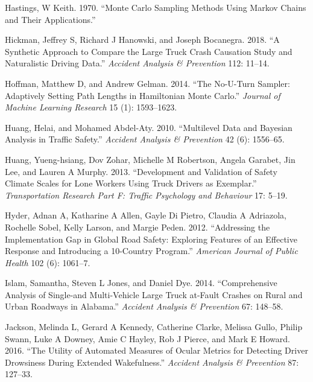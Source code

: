 \documentclass[12pt]{book}
\numberwithin{equation}{chapter}
\begin{document}
\leavevmode\hypertarget{ref-hastings1970monte}{}%
Hastings, W Keith. 1970. ``Monte Carlo Sampling Methods Using Markov Chains and Their Applications.''

\leavevmode\hypertarget{ref-hickman2018synthetic}{}%
Hickman, Jeffrey S, Richard J Hanowski, and Joseph Bocanegra. 2018. ``A Synthetic Approach to Compare the Large Truck Crash Causation Study and Naturalistic Driving Data.'' \emph{Accident Analysis \& Prevention} 112: 11--14.

\leavevmode\hypertarget{ref-hoffman2014no}{}%
Hoffman, Matthew D, and Andrew Gelman. 2014. ``The No-U-Turn Sampler: Adaptively Setting Path Lengths in Hamiltonian Monte Carlo.'' \emph{Journal of Machine Learning Research} 15 (1): 1593--1623.

\leavevmode\hypertarget{ref-huang2010multilevel}{}%
Huang, Helai, and Mohamed Abdel-Aty. 2010. ``Multilevel Data and Bayesian Analysis in Traffic Safety.'' \emph{Accident Analysis \& Prevention} 42 (6): 1556--65.

\leavevmode\hypertarget{ref-huang2013development}{}%
Huang, Yueng-hsiang, Dov Zohar, Michelle M Robertson, Angela Garabet, Jin Lee, and Lauren A Murphy. 2013. ``Development and Validation of Safety Climate Scales for Lone Workers Using Truck Drivers as Exemplar.'' \emph{Transportation Research Part F: Traffic Psychology and Behaviour} 17: 5--19.

\leavevmode\hypertarget{ref-hyder2012addressing}{}%
Hyder, Adnan A, Katharine A Allen, Gayle Di Pietro, Claudia A Adriazola, Rochelle Sobel, Kelly Larson, and Margie Peden. 2012. ``Addressing the Implementation Gap in Global Road Safety: Exploring Features of an Effective Response and Introducing a 10-Country Program.'' \emph{American Journal of Public Health} 102 (6): 1061--7.

\leavevmode\hypertarget{ref-islam2014comprehensive}{}%
Islam, Samantha, Steven L Jones, and Daniel Dye. 2014. ``Comprehensive Analysis of Single-and Multi-Vehicle Large Truck at-Fault Crashes on Rural and Urban Roadways in Alabama.'' \emph{Accident Analysis \& Prevention} 67: 148--58.

\leavevmode\hypertarget{ref-jackson2016utility}{}%
Jackson, Melinda L, Gerard A Kennedy, Catherine Clarke, Melissa Gullo, Philip Swann, Luke A Downey, Amie C Hayley, Rob J Pierce, and Mark E Howard. 2016. ``The Utility of Automated Measures of Ocular Metrics for Detecting Driver Drowsiness During Extended Wakefulness.'' \emph{Accident Analysis \& Prevention} 87: 127--33.
\end{document}
